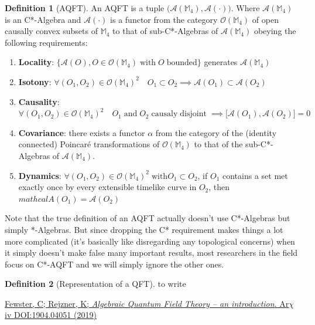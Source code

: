 \documentclass[a4paper,11pt]{article}
\numberwithin{equation}{section}
\theoremstyle{definition}
\newtheorem{definition}{Definition}
\begin{document}
\begin{definition}[AQFT]
    An AQFT is a tuple $\big(\mathcal{A}(\mathbb{M}_4), \mathcal{A}(\cdot)\big)$. Where $\mathcal{A}(\mathbb{M}_4)$ is an C*-Algebra and $\mathcal{A}(\cdot)$ is a functor from the category $\mathcal{O}(\mathbb{M}_4)$ of open causally convex subsets of $\mathbb{M}_4$ to that of sub-C*-Algebras of $\mathcal{A}(\mathbb{M}_4)$ obeying the following requirements:
    \begin{enumerate}
        \item \textbf{Locality}:  $\big\{\mathcal{A}(O), O \in \mathcal{O}(\mathbb{M}_4) \; \mathrm{with}\; O\; \mathrm{bounded}\big\}$ generates $\mathcal{A}(\mathbb{M}_4)$
        \item \textbf{Isotony}: $\forall (O_1, O_2) \in \mathcal{O}(\mathbb{M}_4)^2 \quad O_1\subset O_2 \implies \mathcal{A}(O_1)\subset\mathcal{A}(O_2)$
        \item \textbf{Causality}: $\forall (O_1, O_2) \in \mathcal{O}(\mathbb{M}_4)^2 \quad O_1 \; \mathrm{and}\; O_2\; \mathrm{causaly}\;\mathrm{disjoint}\; \implies \big[\mathcal{A}(O_1),\mathcal{A}(O_2)\big]=0$
        \item \textbf{Covariance}: there exists a functor $\alpha$ from the category of the (identity connected) Poincaré transformations of $\mathcal{O}(\mathbb{M}_4)$ to that of the sub-C*-Algebras of $\mathcal{A}(\mathbb{M}_4)$.
        \item \textbf{Dynamics}: $\forall (O_1, O_2) \in \mathcal{O}(\mathbb{M}_4)^2 \;\mathrm{with} O_1 \subset O_2$, if $O_1$ contains a set met exactly once by every extensible timelike curve in $O_2$, then $mathcal{A}(O_1)=\mathcal{A}(O_2)$
    \end{enumerate}
Note that the true definition of an AQFT actually doesn't use C*-Algebras but simply *-Algebras. But since dropping the C* requirement makes things a lot more complicated (it's basically like disregarding any topological concerns) when it simply doesn't make false many important results, most researchers in the field focus on C*-AQFT and we will simply ignore the other ones.
\end{definition}

\begin{definition}[Representation of a QFT]
    \color{red}to write\color{black}
\end{definition}


\newpage
\begin{thebibliography}{99}

    \href{https://arxiv.org/abs/1904.04051}{Fewster, C; Rejzner, K; \textit{Algebraic Quantum Field Theory -- an introduction}. Ar$\chi$iv DOI:1904.04051 (2019)} 
        
\end{thebibliography}
\end{document}
